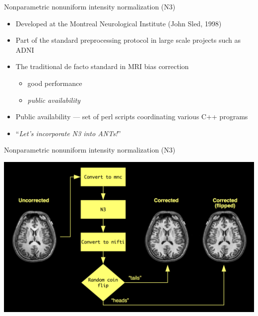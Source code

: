 \documentclass[ignorenonframetext,]{beamer}
\providecommand{\tightlist}{%
  \setlength{\itemsep}{0pt}\setlength{\parskip}{0pt}}
\begin{document}
\begin{frame}{Nonparametric nonuniform intensity normalization (N3)}

\begin{itemize}
\item
  Developed at the Montreal Neurological Institute (John Sled, 1998)
\item
  Part of the standard preprocessing protocol in large scale projects
  such as ADNI
\item
  The traditional de facto standard in MRI bias correction

  \begin{itemize}
  \tightlist
  \item
    good performance
  \item
    \emph{public availability}
  \end{itemize}
\item
  Public availability --- set of perl scripts coordinating various C++
  programs
\item
  ``\emph{Let's incorporate N3 into ANTs!}''
\end{itemize}

\end{frame}

\begin{frame}{Nonparametric nonuniform intensity normalization (N3)}

\includegraphics{./tools/n4/figures/whyN4.png}

\end{frame}
\end{document}

